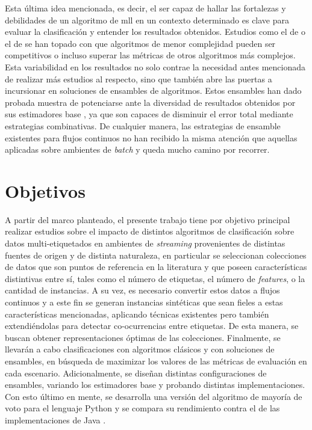 Esta última idea mencionada, es decir, el ser capaz de hallar las fortalezas y
debilidades de un algoritmo de \acrshort{mll} en un contexto determinado es
clave para evaluar la clasificación y entender los resultados obtenidos.
Estudios como el de \citeauthor{sousa_multi-label_2018}
\cite{sousa_multi-label_2018} o el de \citeauthor{read_scalable_2012}
\cite{read_scalable_2012} se han topado con que algoritmos de menor complejidad
pueden ser competitivos o incluso superar las métricas de otros algoritmos más
complejos. Esta variabilidad en los resultados no solo contrae la necesidad
antes mencionada de realizar más estudios al respecto, sino que también abre las
puertas a incursionar en soluciones de ensambles de algoritmos. Estos ensambles
han dado probada muestra de potenciarse ante la diversidad de resultados
obtenidos por sus estimadores base \cite{polikar_polikar_2006}, ya que son
capaces de disminuir el error total mediante estrategias combinativas. De
cualquier manera, las estrategias de ensamble existentes para flujos continuos
no han recibido la misma atención que aquellas aplicadas sobre ambientes de
\textit{batch} y queda mucho camino por recorrer.



\section{Objetivos}

A partir del marco planteado, el presente trabajo tiene por objetivo principal
realizar estudios sobre el impacto de distintos algoritmos de clasificación
sobre datos multi-etiquetados en ambientes de \textit{streaming} provenientes de
distintas fuentes de origen y de distinta naturaleza, en particular se
seleccionan colecciones de datos que son puntos de referencia en la literatura y
que poseen características distintivas entre sí, tales como el número de
etiquetas, el número de \textit{features}, o la cantidad de instancias. A su
vez, es necesario convertir estos datos a flujos continuos y a este fin se
generan instancias sintéticas que sean fieles a estas características
mencionadas, aplicando técnicas existentes pero también extendiéndolas para
detectar co-ocurrencias entre etiquetas. De esta manera, se buscan obtener
representaciones óptimas de las colecciones. Finalmente, se llevarán a cabo
clasificaciones con algoritmos clásicos y con soluciones de ensambles, en
búsqueda de maximizar los valores de las métricas de evaluación en cada
escenario. Adicionalmente, se diseñan distintas configuraciones de ensambles,
variando los estimadores base y probando distintas implementaciones. Con esto
último en mente, se desarrolla una versión del algoritmo de mayoría de voto
 para el lenguaje
Python  y se compara su rendimiento contra el de
las implementaciones de Java .

